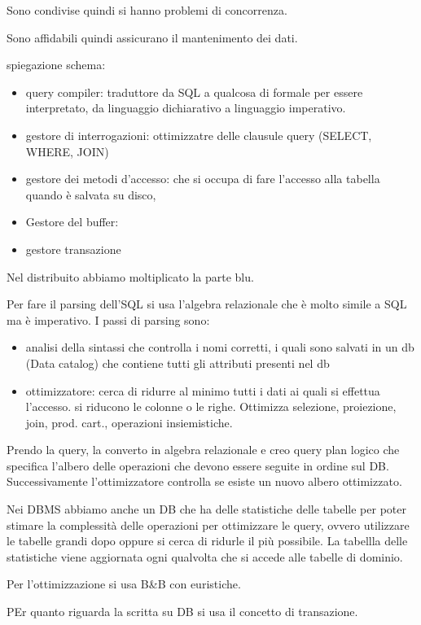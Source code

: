 Sono condivise quindi si hanno problemi di concorrenza.

Sono affidabili quindi assicurano il mantenimento dei dati.


spiegazione schema:
\begin{itemize}
    \item query compiler: traduttore da SQL a qualcosa di formale per essere interpretato, da linguaggio dichiarativo a linguaggio imperativo.
    \item gestore di interrogazioni: ottimizzatre delle clausule query (SELECT, WHERE, JOIN)
    \item gestore dei metodi d'accesso: che si occupa di fare l'accesso alla tabella quando è salvata su disco,
    \item Gestore del buffer:
    \item gestore transazione
\end{itemize}
Nel distribuito abbiamo moltiplicato la parte blu.

Per fare il parsing dell'SQL si usa l'algebra relazionale che è molto simile a SQL ma
è imperativo. I passi di parsing sono:
\begin{itemize}
    \item analisi della sintassi che controlla i nomi corretti, i quali sono salvati in un db (Data catalog)
          che contiene tutti gli attributi presenti nel db
    \item ottimizzatore: cerca di ridurre al minimo tutti i dati ai quali si effettua l'accesso.
          si riducono le colonne o le righe. Ottimizza selezione, proiezione, join, prod. cart., operazioni insiemistiche.
\end{itemize}
Prendo la query, la converto in algebra relazionale e creo query plan logico
che specifica l'albero delle operazioni che devono essere seguite in ordine sul DB.
Successivamente l'ottimizzatore controlla se esiste un nuovo albero ottimizzato.

Nei DBMS abbiamo anche un DB che ha delle statistiche delle tabelle per poter stimare
la complessità delle operazioni per ottimizzare le query, ovvero utilizzare
le tabelle grandi dopo oppure si cerca di ridurle il più possibile. La tabellla delle
statistiche viene aggiornata ogni qualvolta che si accede alle tabelle di dominio.

Per l'ottimizzazione si usa B\&B con euristiche.

PEr quanto riguarda la scritta su DB si usa il concetto di transazione.

